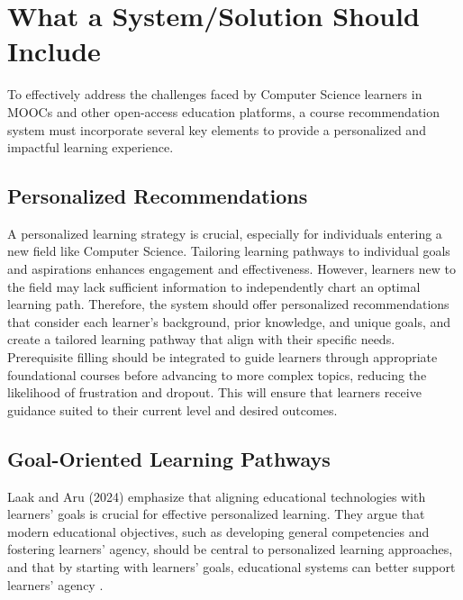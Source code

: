 \section{What a System/Solution Should Include}

To effectively address the challenges faced by Computer Science learners in MOOCs and other open-access education platforms, a course recommendation system must incorporate several key elements to provide a personalized and impactful learning experience.

\subsection{Personalized Recommendations}

A personalized learning strategy is crucial, especially for individuals entering a new field like Computer Science. Tailoring learning pathways to individual goals and aspirations enhances engagement and effectiveness. However, learners new to the field may lack sufficient information to independently chart an optimal learning path. Therefore, the system should offer personalized recommendations that consider each learner's background, prior knowledge, and unique goals, and create a tailored learning pathway that align with their specific needs. Prerequisite filling should be integrated to guide learners through appropriate foundational courses before advancing to more complex topics, reducing the likelihood of frustration and dropout. This will ensure that learners receive guidance suited to their current level and desired outcomes.


\subsection{Goal-Oriented Learning Pathways}

Laak and Aru (2024) emphasize that aligning educational technologies with learners' goals is crucial for effective personalized learning. They argue that modern educational objectives, such as developing general competencies and fostering learners' agency, should be central to personalized learning approaches, and that by starting with learners' goals, educational systems can better support learners' agency \cite{laak_ai_2024}.

